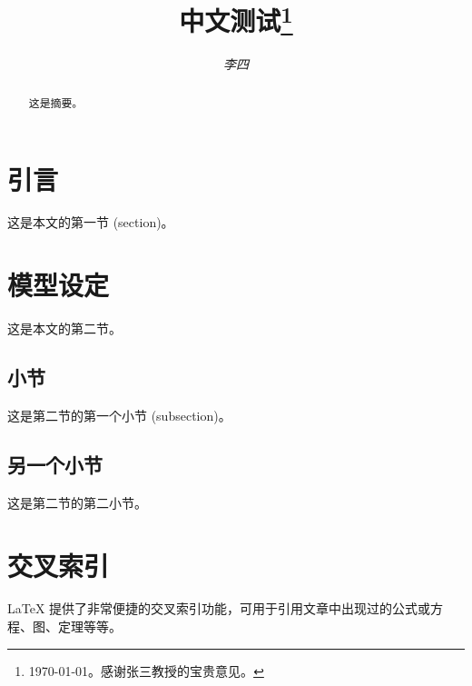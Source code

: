 \documentclass[12pt]{ctexart}
\title{
    中文测试\thanks{
        \today。感谢张三教授的宝贵意见。}
    }
\author{\textit{李四}}
\begin{document}
\maketitle

\begin{abstract}

这是摘要。

\end{abstract}

\section{引言}

这是本文的第一节 (section)。

\section{模型设定}

这是本文的第二节。

\subsection{小节}

这是第二节的第一个小节 (subsection)。

\subsection{另一个小节}

这是第二节的第二小节。

\section{交叉索引}

\LaTeX{} 提供了非常便捷的交叉索引功能，可用于引用文章中出现过的公式或方程、图、定理等等。
\end{document}
